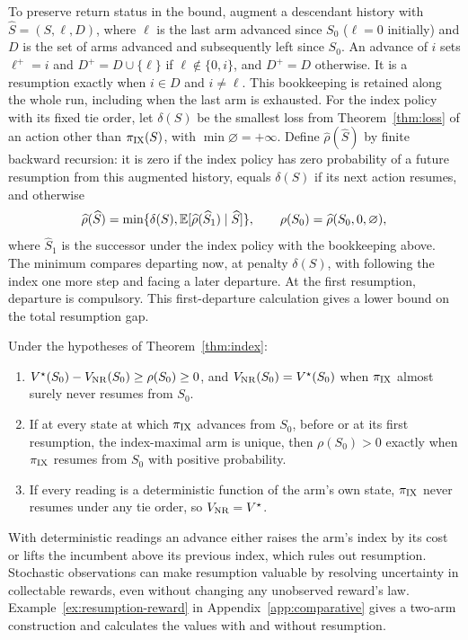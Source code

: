 To preserve return status in the bound, augment a descendant history with
$\widehat S=(S,\ell,D)$, where $\ell$ is the last arm advanced since $S_0$
($\ell=0$ initially) and $D$ is the set of arms advanced and subsequently left since
$S_0$. An advance of $i$ sets $\ell^+=i$ and
$D^+=D\cup\{\ell\}$ if $\ell\notin\{0,i\}$, and $D^+=D$ otherwise.
It is a resumption exactly when $i\in D$ and $i\ne\ell$. This bookkeeping is retained along the
whole run, including when the last arm is exhausted.
For the index policy with its fixed tie order, let $\delta(S)$ be the smallest
loss from Theorem~\ref{thm:loss} of an action other than $\pi_{\rm IX}(S)$,
with $\min\varnothing=+\infty$. Define $\widehat\rho(\widehat S)$ by finite backward
recursion: it is zero if the index policy has zero probability of a future resumption
from this augmented history, equals $\delta(S)$ if its next action resumes, and otherwise
\[
 \widehat\rho(\widehat S)
 =\min\{\delta(S),\mathbb{E}[\widehat\rho(\widehat S_1)\mid\widehat S]\},
 \qquad \rho(S_0)=\widehat\rho(S_0,0,\varnothing),
\]
where $\widehat S_1$ is the successor under the index policy with the bookkeeping above.
The minimum compares departing now, at penalty $\delta(S)$, with following the
index one more step and facing a later departure. At the first resumption,
departure is compulsory. This first-departure calculation gives a lower bound
on the total resumption gap.

\begin{proposition}\label{prop:resumption}
Under the hypotheses of Theorem~\ref{thm:index}:
\begin{enumerate}
\item[(i)] $V^\star(S_0)-V_{\rm NR}(S_0)\ge\rho(S_0)\ge0$, and $V_{\rm NR}(S_0)=V^\star(S_0)$ when $\pi_{\rm IX}$ almost surely never resumes from $S_0$.
\item[(ii)] If at every state at which $\pi_{\rm IX}$ advances from $S_0$, before or at its first resumption, the index-maximal arm is unique, then $\rho(S_0)>0$ exactly when $\pi_{\rm IX}$ resumes from $S_0$
 with positive probability.
\item[(iii)] If every reading is a deterministic function of the arm's own
 state, $\pi_{\rm IX}$ never resumes under any tie order, so $V_{\rm NR}=V^\star$.
\end{enumerate}
\end{proposition}

With deterministic readings an advance either raises the arm's index by its cost
or lifts the incumbent above its previous index, which rules out resumption.
Stochastic observations can make resumption valuable by resolving uncertainty in
collectable rewards, even without changing any unobserved reward's law.
Example~\ref{ex:resumption-reward} in Appendix~\ref{app:comparative} gives a
two-arm construction and calculates the values with and without resumption.
